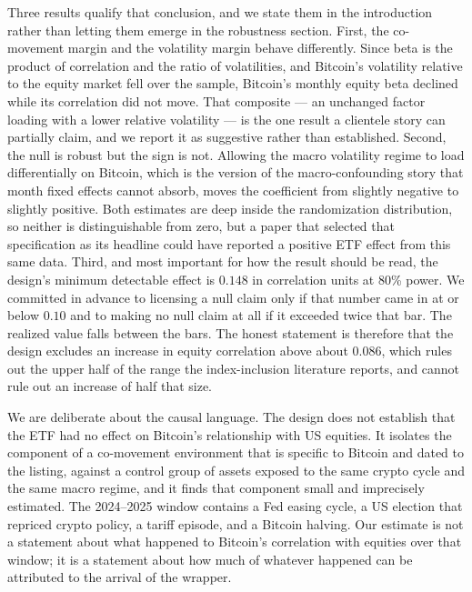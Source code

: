 \documentclass[12pt,a4paper]{article}
\begin{document}
Three results qualify that conclusion, and we state them in the introduction rather than letting them emerge in the robustness section. First, the co-movement margin and the volatility margin behave differently. Since beta is the product of correlation and the ratio of volatilities, and Bitcoin's volatility relative to the equity market fell over the sample, Bitcoin's monthly equity beta declined while its correlation did not move. That composite — an unchanged factor loading with a lower relative volatility — is the one result a clientele story can partially claim, and we report it as suggestive rather than established. Second, the null is robust but the sign is not. Allowing the macro volatility regime to load differentially on Bitcoin, which is the version of the macro-confounding story that month fixed effects cannot absorb, moves the coefficient from slightly negative to slightly positive. Both estimates are deep inside the randomization distribution, so neither is distinguishable from zero, but a paper that selected that specification as its headline could have reported a positive ETF effect from this same data. Third, and most important for how the result should be read, the design's minimum detectable effect is
$0.148$ in correlation units at 80\% power. We committed in advance to licensing a null claim only if that number came in at or below
$0.10$ and to making no null claim at all if it exceeded twice that bar. The realized value falls between the bars. The honest statement is therefore that the design excludes an increase in equity correlation above about
$0.086$, which rules out the upper half of the range the index-inclusion literature reports, and cannot rule out an increase of half that size.

We are deliberate about the causal language. The design does not establish that the ETF had no effect on Bitcoin's relationship with US equities. It isolates the component of a co-movement environment that is specific to Bitcoin and dated to the listing, against a control group of assets exposed to the same crypto cycle and the same macro regime, and it finds that component small and imprecisely estimated. The 2024--2025 window contains a Fed easing cycle, a US election that repriced crypto policy, a tariff episode, and a Bitcoin halving. Our estimate is not a statement about what happened to Bitcoin's correlation with equities over that window; it is a statement about how much of whatever happened can be attributed to the arrival of the wrapper.
\end{document}
